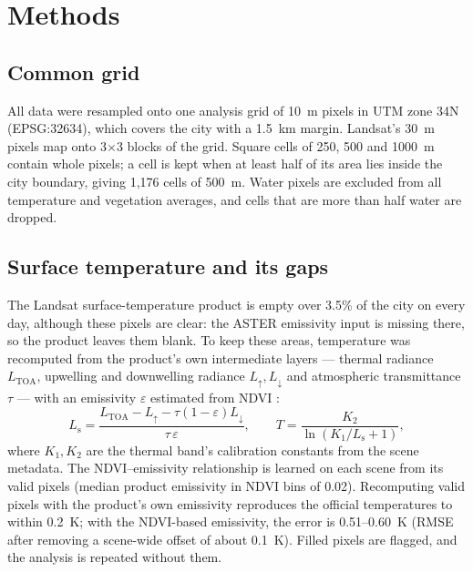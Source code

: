 \documentclass[11pt,a4paper]{article}
\begin{document}
\section{Methods}
\label{sec:methods}

\subsection{Common grid}

All data were resampled onto one analysis grid of 10~m pixels in UTM zone 34N (EPSG:32634), which covers the city with a 1.5~km margin. Landsat's 30~m pixels map onto 3$\times$3 blocks of the grid. Square cells of 250, 500 and 1000~m contain whole pixels; a cell is kept when at least half of its area lies inside the city boundary, giving 1,176 cells of 500~m. Water pixels are excluded from all temperature and vegetation averages, and cells that are more than half water are dropped.

\subsection{Surface temperature and its gaps}

The Landsat surface-temperature product is empty over 3.5\% of the city on every day, although these pixels are clear: the ASTER emissivity input is missing there, so the product leaves them blank. To keep these areas, temperature was recomputed from the product's own intermediate layers --- thermal radiance $L_\text{TOA}$, upwelling and downwelling radiance $L_\uparrow, L_\downarrow$ and atmospheric transmittance $\tau$ --- with an emissivity $\varepsilon$ estimated from NDVI \cite{sobrino2004}:
\begin{equation}
L_\text{s} = \frac{L_\text{TOA} - L_\uparrow - \tau (1 - \varepsilon) L_\downarrow}{\tau\, \varepsilon}, \qquad
T = \frac{K_2}{\ln\!\left(K_1 / L_\text{s} + 1\right)},
\end{equation}
where $K_1, K_2$ are the thermal band's calibration constants from the scene metadata. The NDVI–emissivity relationship is learned on each scene from its valid pixels (median product emissivity in NDVI bins of 0.02). Recomputing valid pixels with the product's own emissivity reproduces the official temperatures to within 0.2~K; with the NDVI-based emissivity, the error is 0.51--0.60~K (RMSE after removing a scene-wide offset of about 0.1~K). Filled pixels are flagged, and the analysis is repeated without them.
\end{document}
